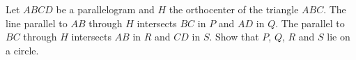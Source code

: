 Let $ABCD$ be a parallelogram and $H$ the orthocenter of the triangle $ABC$.
The line parallel to $AB$ through $H$ intersects $BC$ in $P$ and $AD$ in $Q$.
The parallel to $BC$ through $H$ intersects $AB$ in $R$ and $CD$ in $S$.
Show that $P$, $Q$, $R$ and $S$ lie on a circle.